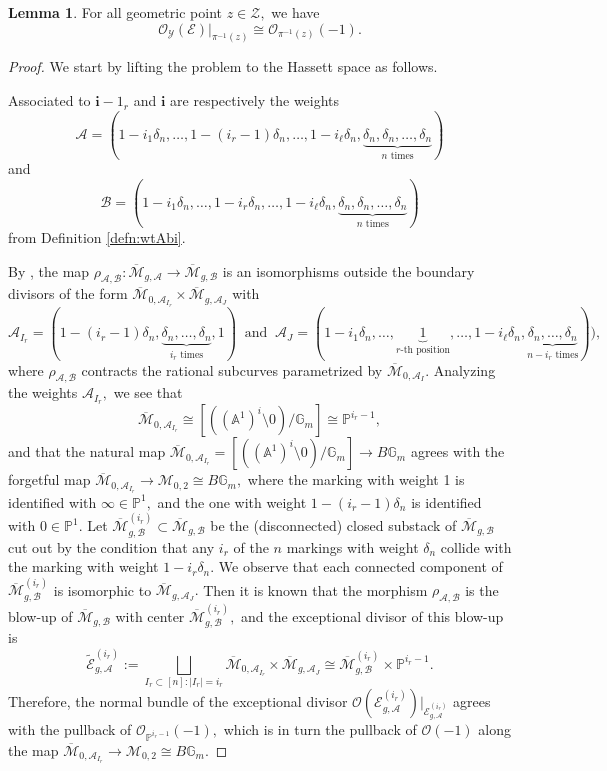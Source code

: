 \documentclass[10.5pt]{amsart}
\theoremstyle{definition}
\theoremstyle{definition}
\theoremstyle{definition}
\theoremstyle{definition}
\newtheorem{lemma}[theorem]{Lemma}
\newcommand{\ol}[1]{\overline{#1}}
\newcommand{\PP}{\mathbb{P}}
\newcommand{\Mcal}{\mathcal{M}}
\newcommand{\Mbar}{\ol{\Mcal}}
\newcommand{\cZ}{\mathcal{Z}}
\newcommand{\cE}{\mathcal{E}}
\newcommand{\cO}{\mathcal{O}}
\newcommand{\cY}{\mathcal{Y}}
\newcommand{\cA}{\mathcal{A}}
\newcommand{\cB}{\mathcal{B}}
\newcommand{\bi}{\boldsymbol{i}}
\newcommand{\cZri}{\cZ}
\newcommand{\cEri}{\cE}
\newcommand{\piri}{\pi}
\newcommand{\Himor}{\cY}
\begin{document}
\begin{lemma} \label{lem:O(-1)}
    For all geometric point $z\in \cZri,$ we have $$\cO_{\Himor}(\cEri)|_{\piri^{-1}(z)} \cong \cO_{\piri^{-1}(z)}(-1).$$ 
\end{lemma}
\begin{proof}

We start by lifting the problem to the Hassett space as follows.

Associated to $\bi-1_r$ and $\bi$ are respectively the weights 
$$\cA=(1-i_1\delta_n, \dots, 1-(i_r-1)\delta_n, \dots, 1-i_\ell\delta_n ,\underbrace{\delta_n, \delta_n, \dots, \delta_n}_{n \text{ times}})$$ and $$\cB=(1-i_1\delta_n, \dots, 1-i_r\delta_n, \dots, 1-i_\ell\delta_n ,\underbrace{\delta_n, \delta_n, \dots, \delta_n}_{n \text{ times}})$$ from Definition \ref{defn:wtAbi}. 

By \cite[Proposition 4.5]{hassett}, the map $\rho_{\cA, \cB}: \Mbar_{g, \cA}\to \Mbar_{g, \cB}$ is an isomorphisms outside the boundary divisors of the form $\Mbar_{0,\cA_{I_r}} \times \Mbar_{g,\cA_J}$ with $$\cA_{I_r}=(1-(i_r-1)\delta_n, \underbrace{\delta_n, \dots, \delta_n }_{i_r \text{ times} }, 1) \ \text{ and } \ \cA_J=(1-i_1\delta_n, \dots, \underbrace{1}_{r\text{-th position}}, \dots, 1-i_\ell\delta_n,  \underbrace{\delta_n, \dots, \delta_n}_{n-i_r \text{ times} })),$$
where $\rho_{\cA, \cB}$ contracts the rational subcurves parametrized by $\Mbar_{0,\cA_I}$.  Analyzing the weights $\mathcal{A}_{I_r},$ we see that $$\Mbar_{0, \mathcal{A}_{I_r}}\cong [((\mathbb{A}^1)^i\setminus 0)/\mathbb{G}_m] \cong \mathbb{P}^{i_r-1},$$ and that the natural map $\Mbar_{0, \cA_{I_r}} = [((\mathbb{A}^1)^i\setminus 0)/\mathbb{G}_m]\to B\mathbb{G}_m$ agrees with the forgetful map $\Mbar_{0, \cA_{I_r}}\to \mathcal{M}_{0,2}\cong B\mathbb{G}_m,$ where the marking with weight 1 is identified with $\infty\in \PP^1,$ and the one with weight $1-(i_r-1)\delta_n$ is identified with $0\in \PP^1.$ Let $\Mbar_{g,\cB}^{(i_r)}\subset \Mbar_{g,\cB}$ be the (disconnected) closed substack of $\Mbar_{g, \cB}$ cut out by the condition that any $i_r$ of the $n$ markings with weight $\delta_n$ collide with the marking with weight $1-i_r\delta_n.$ We observe that each connected component of $\Mbar_{g,\cB}^{(i_r)}$ is isomorphic to $\Mbar_{g, \cA_J}.$ Then it is known \cite[Remark 4.6]{hassett} that the morphism $\rho_{\cA, \cB}$ is the blow-up of $\Mbar_{g,\cB}$ with center $\Mbar_{g,\cB}^{(i_r)} ,$ and the exceptional divisor of this blow-up is $$\tilde{\cE}^{(i_r)}_{g, \cA} := \bigsqcup_{I_r\subset [n]: |I_r| = i_r} \Mbar_{0, \cA_{I_r}}\times \Mbar_{g, \cA_J}\cong \Mbar_{g, \cB}^{(i_r)}\times \PP^{i_r-1}.$$ Therefore, the normal bundle of the exceptional divisor $\cO(\cE^{(i_r)}_{g, \cA})|_{\cE^{(i_r)}_{g, \cA}}$ agrees with the pullback of $\cO_{\PP^{i_r-1}}(-1),$ which is in turn the pullback of $\mathcal{O}(-1)$ along the map $\Mbar_{0, \cA_{I_r}}\to \mathcal{M}_{0,2}\cong B\mathbb{G}_m.$


\end{proof}
\end{document}
